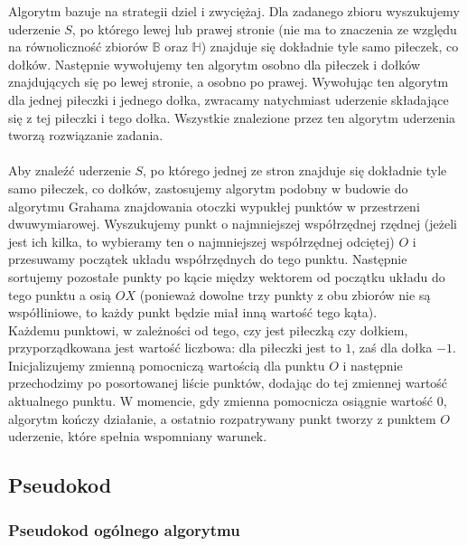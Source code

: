 \documentclass[10pt,a4paper]{article}
\begin{document}
	Algorytm bazuje na strategii dziel i zwyciężaj. Dla zadanego zbioru wyszukujemy uderzenie $S$, po którego lewej lub prawej stronie (nie ma to znaczenia ze względu na równoliczność zbiorów $\mathbb{B}$ oraz $\mathbb{H}$) znajduje się dokładnie tyle samo piłeczek, co dołków. Następnie wywołujemy ten algorytm osobno dla piłeczek i dołków znajdujących się po lewej stronie, a osobno po prawej. Wywołując ten algorytm dla jednej piłeczki i jednego dołka, zwracamy natychmiast uderzenie składające się z tej piłeczki i tego dołka. Wszystkie znalezione przez ten algorytm uderzenia tworzą rozwiązanie zadania. \\~\\
	Aby znaleźć uderzenie $S$, po którego jednej ze stron znajduje się dokładnie tyle samo piłeczek, co dołków, zastosujemy algorytm podobny w budowie do algorytmu Grahama znajdowania otoczki wypukłej punktów w przestrzeni dwuwymiarowej. Wyszukujemy punkt o najmniejszej współrzędnej rzędnej (jeżeli jest ich kilka, to wybieramy ten o najmniejszej współrzędnej odciętej) $O$ i przesuwamy początek układu współrzędnych do tego punktu. Następnie sortujemy pozostałe punkty po kącie między wektorem od początku układu do tego punktu a osią $OX$ (ponieważ dowolne trzy punkty z obu zbiorów nie są współliniowe, to każdy punkt będzie miał inną wartość tego kąta). \\
	Każdemu punktowi, w zależności od tego, czy jest piłeczką czy dołkiem, przyporządkowana jest wartość liczbowa: dla piłeczki jest to $1$, zaś dla dołka $-1$. Inicjalizujemy zmienną pomocniczą wartością dla punktu $O$ i następnie przechodzimy po posortowanej liście punktów, dodając do tej zmiennej wartość aktualnego punktu. W momencie, gdy zmienna pomocnicza osiągnie wartość $0$, algorytm kończy działanie, a ostatnio rozpatrywany punkt tworzy z punktem $O$ uderzenie, które spełnia wspomniany warunek.
	
	\subsection{Pseudokod}
	
	\subsubsection{Pseudokod ogólnego algorytmu}
	
\end{document}
